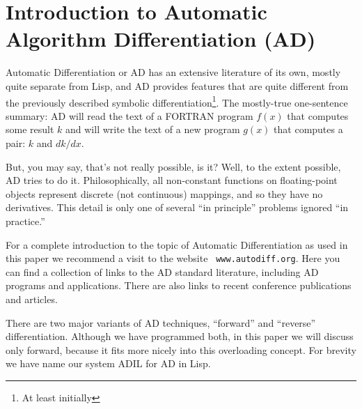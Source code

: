 \documentclass{article}
\begin{document}
\section{Introduction to Automatic Algorithm Differentiation (AD)}

Automatic Differentiation or AD has an extensive literature of its own,
mostly quite separate from Lisp, and AD provides
features that are quite different from the previously described symbolic
differentiation\footnote{At least initially}.  The mostly-true one-sentence summary:
AD will read the text of a FORTRAN program $f(x)$ that computes some result $k$ and 
will write the text of a new program $g(x)$ that computes a pair: $k$ and $dk/dx$.

But, you may say, that's not really possible, is it? Well, to the
extent possible, AD tries to do it. Philosophically, all non-constant functions
on floating-point objects represent discrete (not continuous) mappings,
and so they have no derivatives. This detail is only one
of several ``in principle'' problems ignored ``in practice.''

For a complete introduction to the topic of Automatic Differentiation
as used in this paper we recommend a visit to the website {\tt
www.autodiff.org}.  Here you can find a collection of links to the AD
standard literature, including AD programs and applications.  There
are also links to recent conference publications and articles.

There are two major variants of AD techniques, ``forward'' and ``reverse''
differentiation.  Although we have programmed both, in this paper
we will discuss only forward, because it fits more nicely into this overloading
concept. For brevity we have name our system ADIL for AD in Lisp.
\end{document}
